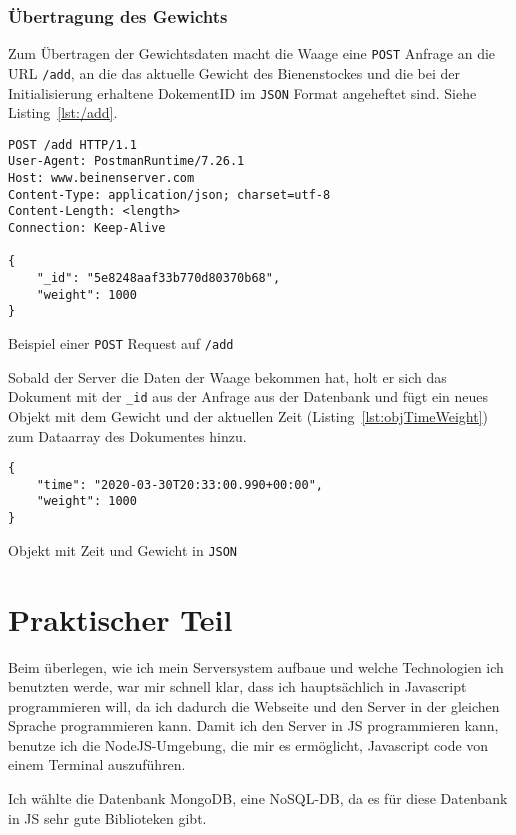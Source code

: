 \documentclass[a4paper, ngerman, 12pt]{scrartcl}
\begin{document}
\subsubsection{Übertragung des Gewichts}
Zum Übertragen der Gewichtsdaten macht die Waage eine \texttt{POST} Anfrage an die URL \texttt{/add}, an die das aktuelle Gewicht des Bienenstockes und die bei der Initialisierung erhaltene DokementID im \texttt{JSON} Format angeheftet sind. Siehe Listing~\ref{lst:/add}.
\begin{listing}[ht]
\centering
\begin{verbatim}
POST /add HTTP/1.1
User-Agent: PostmanRuntime/7.26.1
Host: www.beinenserver.com
Content-Type: application/json; charset=utf-8
Content-Length: <length>
Connection: Keep-Alive

{
    "_id": "5e8248aaf33b770d80370b68",
    "weight": 1000
}
\end{verbatim}
\caption{Beispiel einer \texttt{POST} Request auf \texttt{/add}}\label{lst:/add}
\end{listing}

Sobald der Server die Daten der Waage bekommen hat, holt er sich das Dokument mit der \texttt{\_id} aus der Anfrage aus der Datenbank und fügt ein neues Objekt mit dem Gewicht und der aktuellen Zeit (Listing~\ref{lst:objTimeWeight}) zum Dataarray des Dokumentes hinzu.
\begin{listing}[ht]
\centering
\begin{verbatim}
{
    "time": "2020-03-30T20:33:00.990+00:00",
    "weight": 1000
}
\end{verbatim}
\caption{Objekt mit Zeit und Gewicht in \texttt{JSON}\label{lst:objTimeWeight}}
\end{listing}

\section{Praktischer Teil}

Beim überlegen, wie ich mein Serversystem aufbaue und welche Technologien ich benutzten werde, war mir schnell klar, dass ich hauptsächlich in Javascript programmieren will, da ich dadurch die Webseite und den Server in der gleichen Sprache programmieren kann.
Damit ich den Server in JS programmieren kann, benutze ich die NodeJS-Umgebung, die mir es ermöglicht, Javascript code von einem Terminal auszuführen.

Ich wählte die Datenbank MongoDB, eine NoSQL-DB, da es für diese Datenbank in JS sehr gute Biblioteken gibt.
\end{document}

